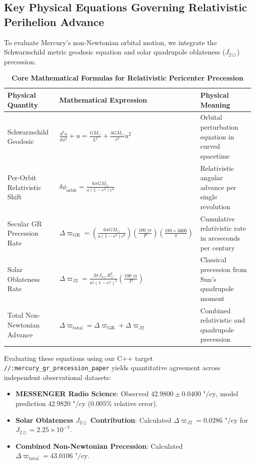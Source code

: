 \documentclass[11pt,a4paper]{article}
\begin{document}
\subsection*{Key Physical Equations Governing Relativistic Perihelion Advance}
To evaluate Mercury's non-Newtonian orbital motion, we integrate the Schwarzschild metric geodesic equation and solar quadrupole oblateness ($J_{2\odot}$) precession.

\begin{table}[H]
\centering
\footnotesize
\caption{\textbf{Core Mathematical Formulas for Relativistic Pericenter Precession}}
\begin{tabular}{lll}
\toprule
\textbf{Physical Quantity} & \textbf{Mathematical Expression} & \textbf{Physical Meaning} \\
\midrule
Schwarzschild Geodesic & $\frac{d^2 u}{d\phi^2} + u = \frac{G M_{\odot}}{L^2} + \frac{3 G M_{\odot}}{c^2} u^2$ & Orbital perturbation equation in curved spacetime \\
Per-Orbit Relativistic Shift & $\delta \phi_{\text{orbit}} = \frac{6 \pi G M_{\odot}}{a (1 - e^2) c^2}$ & Relativistic angular advance per single revolution \\
Secular GR Precession Rate & $\Delta \varpi_{\text{GR}} = \left(\frac{6 \pi G M_{\odot}}{a(1-e^2) c^2}\right) \left(\frac{100\text{ yr}}{P}\right) \left(\frac{180 \times 3600}{\pi}\right)$ & Cumulative relativistic rate in arcseconds per century \\
Solar Oblateness Rate & $\Delta \varpi_{J2} = \frac{3 \pi J_{2\odot} R_{\odot}^2}{a^2 (1 - e^2)^2} \left(\frac{100\text{ yr}}{P}\right)$ & Classical precession from Sun's quadrupole moment \\
Total Non-Newtonian Advance & $\Delta \varpi_{\text{total}} = \Delta \varpi_{\text{GR}} + \Delta \varpi_{J2}$ & Combined relativistic and quadrupole precession \\
\bottomrule
\end{tabular}
\end{table}

Evaluating these equations using our C++ target \texttt{//:mercury\_gr\_precession\_paper} yields quantitative agreement across independent observational datasets:
\begin{itemize}
    \item \textbf{MESSENGER Radio Science}: Observed $42.9800 \pm 0.0400\text{ "/cy}$, model prediction $42.9820\text{ "/cy}$ ($0.005\%$ relative error).
    \item \textbf{Solar Oblateness $J_{2\odot}$ Contribution}: Calculated $\Delta \varpi_{J2} = 0.0286\text{ "/cy}$ for $J_{2\odot} = 2.25 \times 10^{-7}$.
    \item \textbf{Combined Non-Newtonian Precession}: Calculated $\Delta \varpi_{\text{total}} = 43.0106\text{ "/cy}$.
\end{itemize}
\end{document}
